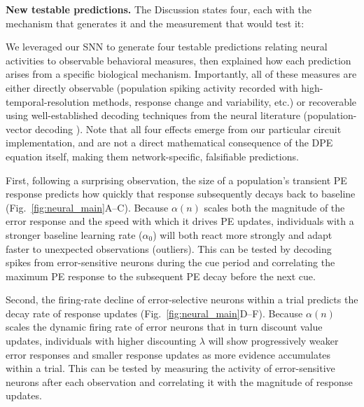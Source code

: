 \textbf{New testable predictions.} The Discussion states four, each with the mechanism that generates it and the measurement that would test it:

\begin{ms}
We leveraged our SNN to generate four testable predictions relating neural activities to observable behavioral measures, then explained how each prediction arises from a specific biological mechanism. Importantly, all of these measures are either directly observable (population spiking activity recorded with high-temporal-resolution methods, response change and variability, etc.) or recoverable using well-established decoding techniques from the neural literature (population-vector decoding \citep{georgopoulos1986neuronal, wu2006bayesian}). Note that all four effects emerge from our particular circuit implementation, and are not a direct mathematical consequence of the DPE equation itself, making them network-specific, falsifiable predictions.

First, following a surprising observation, the size of a population's transient PE response predicts how quickly that response subsequently decays back to baseline (Fig.~\ref{fig:neural_main}A--C). Because $\alpha(n)$ scales both the magnitude of the error response and the speed with which it drives PE updates, individuals with a stronger baseline learning rate ($\alpha_0$) will both react more strongly and adapt faster to unexpected observations (outliers). This can be tested by decoding spikes from error-sensitive neurons during the cue period and correlating the maximum PE response to the subsequent PE decay before the next cue.

Second, the firing-rate decline of error-selective neurons within a trial predicts the decay rate of response updates (Fig.~\ref{fig:neural_main}D--F). Because $\alpha(n)$ scales the dynamic firing rate of error neurons that in turn discount value updates, individuals with higher discounting $\lambda$ will show progressively weaker error responses and smaller response updates as more evidence accumulates within a trial. This can be tested by measuring the activity of error-sensitive neurons after each observation and correlating it with the magnitude of response updates.


\end{ms}
